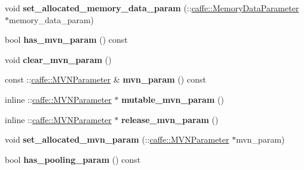 \begin{DoxyCompactItemize}
\item 
\mbox{\label{classcaffe_1_1_v1_layer_parameter_a66e33c91761a6639a3a1eeefbf9d0236}} 
void {\bfseries set\+\_\+allocated\+\_\+memory\+\_\+data\+\_\+param} (\+::\mbox{\hyperlink{classcaffe_1_1_memory_data_parameter}{caffe\+::\+Memory\+Data\+Parameter}} $\ast$memory\+\_\+data\+\_\+param)
\item 
\mbox{\label{classcaffe_1_1_v1_layer_parameter_a59706aefd579671dcb845ba91e3ef0a5}} 
bool {\bfseries has\+\_\+mvn\+\_\+param} () const
\item 
\mbox{\label{classcaffe_1_1_v1_layer_parameter_a017de11f3821e89648a1c0fe0a183890}} 
void {\bfseries clear\+\_\+mvn\+\_\+param} ()
\item 
\mbox{\label{classcaffe_1_1_v1_layer_parameter_adca912a87747f31a46dc730cc9938fb5}} 
const \+::\mbox{\hyperlink{classcaffe_1_1_m_v_n_parameter}{caffe\+::\+M\+V\+N\+Parameter}} \& {\bfseries mvn\+\_\+param} () const
\item 
\mbox{\label{classcaffe_1_1_v1_layer_parameter_a71e3dfd5a1eaf11eed2d03a2347b9f41}} 
inline \+::\mbox{\hyperlink{classcaffe_1_1_m_v_n_parameter}{caffe\+::\+M\+V\+N\+Parameter}} $\ast$ {\bfseries mutable\+\_\+mvn\+\_\+param} ()
\item 
\mbox{\label{classcaffe_1_1_v1_layer_parameter_a2aa7d30ceb224d12ee25bbe1845bd39c}} 
inline \+::\mbox{\hyperlink{classcaffe_1_1_m_v_n_parameter}{caffe\+::\+M\+V\+N\+Parameter}} $\ast$ {\bfseries release\+\_\+mvn\+\_\+param} ()
\item 
\mbox{\label{classcaffe_1_1_v1_layer_parameter_ae70b2d9168b17087a3c7a8ebabf2f187}} 
void {\bfseries set\+\_\+allocated\+\_\+mvn\+\_\+param} (\+::\mbox{\hyperlink{classcaffe_1_1_m_v_n_parameter}{caffe\+::\+M\+V\+N\+Parameter}} $\ast$mvn\+\_\+param)
\item 
\mbox{\label{classcaffe_1_1_v1_layer_parameter_ac7e4afa7a78c6acf7140914eb878d0da}} 
bool {\bfseries has\+\_\+pooling\+\_\+param} () const

\end{DoxyCompactItemize}
